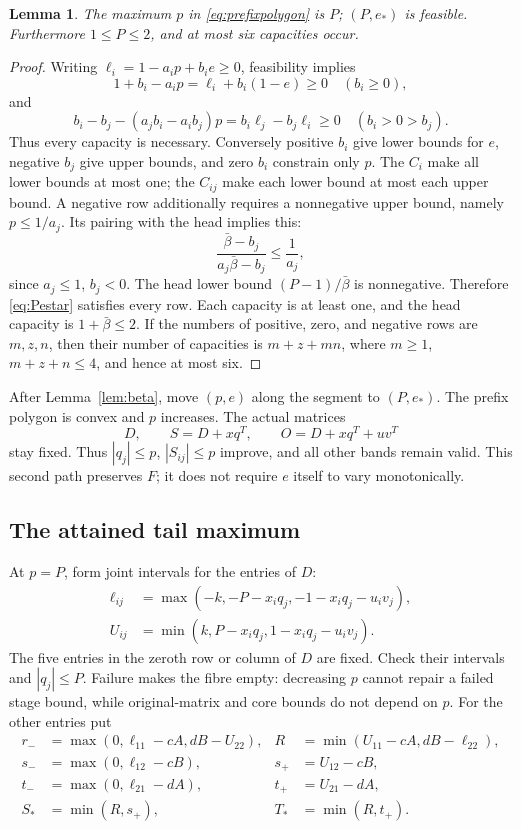 \documentclass[11pt,reqno]{amsart}
\newtheorem{lemma}[theorem]{Lemma}
\theoremstyle{definition}
\theoremstyle{remark}
\begin{document}
\begin{lemma}\label{lem:prefixcap}
The maximum \(p\) in \eqref{eq:prefixpolygon} is \(P\);
\((P,e_*)\) is feasible. Furthermore \(1\le P\le2\), and at most six
capacities occur.
\end{lemma}
\begin{proof}
Writing \(\ell_i=1-a_ip+b_ie\ge0\), feasibility implies
\[
1+b_i-a_ip=\ell_i+b_i(1-e)\ge0\quad(b_i\ge0),
\]
and
\[
b_i-b_j-(a_jb_i-a_ib_j)p=b_i\ell_j-b_j\ell_i\ge0
\quad(b_i>0>b_j).
\]
Thus every capacity is necessary.
Conversely positive \(b_i\) give lower bounds for \(e\), negative
\(b_j\) give upper bounds, and zero \(b_i\) constrain only \(p\).
The \(C_i\) make all lower bounds at most one; the \(C_{ij}\) make
each lower bound at most each upper bound.
A negative row additionally requires a nonnegative upper bound,
namely \(p\le1/a_j\). Its pairing with the head implies this:
\[
\frac{\bar\beta-b_j}{a_j\bar\beta-b_j}\le\frac1{a_j},
\]
since \(a_j\le1\), \(b_j<0\).
The head lower bound \((P-1)/\bar\beta\) is nonnegative.
Therefore \eqref{eq:Pestar} satisfies every row.
Each capacity is at least one, and the head capacity is
\(1+\bar\beta\le2\). If the numbers of positive, zero, and negative
rows are \(m,z,n\), then their number of capacities is \(m+z+mn\),
where \(m\ge1\), \(m+z+n\le4\), and hence at most six.
\end{proof}

After Lemma~\ref{lem:beta}, move \((p,e)\) along the segment to
\((P,e_*)\). The prefix polygon is convex and \(p\) increases.
The actual matrices
\[
D,\qquad S=D+xq^T,\qquad O=D+xq^T+uv^T
\]
stay fixed. Thus \(|q_j|\le p\), \(|S_{ij}|\le p\) improve, and
all other bands remain valid. This second path preserves \(F\);
it does not require \(e\) itself to vary monotonically.

\subsection{The attained tail maximum}
At \(p=P\), form joint intervals for the entries of \(D\):
\begin{equation}\label{eq:entrycaps}
\begin{split}
\ell_{ij}&=\max(-k,-P-x_iq_j,-1-x_iq_j-u_iv_j),\\
U_{ij}&=\min(k,P-x_iq_j,1-x_iq_j-u_iv_j).
\end{split}
\end{equation}
The five entries in the zeroth row or column of \(D\) are fixed.
Check their intervals and \(|q_j|\le P\). Failure makes the fibre
empty: decreasing \(p\) cannot repair a failed stage bound, while
original-matrix and core bounds do not depend on \(p\).
For the other entries put
\begin{align*}
r_-&=\max(0,\ell_{11}-cA,dB-U_{22}),
&R&=\min(U_{11}-cA,dB-\ell_{22}),\\
s_-&=\max(0,\ell_{12}-cB),
&s_+&=U_{12}-cB,\\
t_-&=\max(0,\ell_{21}-dA),
&t_+&=U_{21}-dA,\\
S_*&=\min(R,s_+),
&T_*&=\min(R,t_+).
\end{align*}
\end{document}
